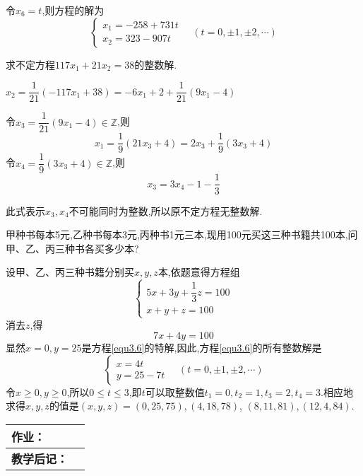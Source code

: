 令$x_{6}=t$,则方程的解为
\begin{equation*}
	\begin{cases}
		x_{1}=-258+731 t \\
		x_{2}=323-907 t
	\end{cases} \quad(t=0, \pm 1, \pm 2, \cdots)
\end{equation*}

\example 求不定方程$117 x_{1}+21 x_{2}=38$的整数解.

\solve $x_{2}=\dfrac{1}{21}\left(-117 x_{1}+38\right)=-6 x_{1}+2+\dfrac{1}{21}\left(9 x_{1}-4\right)$

令$x_{3}=\dfrac{1}{21}\left(9 x_{1}-4\right) \in \mathbb{Z}$,则
\begin{equation*}
	x_{1}=\frac{1}{9}\left(21 x_{3}+4\right)=2 x_{3}+\frac{1}{9}\left(3 x_{3}+4\right)
\end{equation*}
令$x_{4}=\dfrac{1}{9}\left(3 x_{3}+4\right) \in \mathbb{Z}$,则
\begin{equation*}
	x_{3}=3 x_{4}-1-\frac{1}{3}
\end{equation*}

此式表示$x_{3}, x_{4}$不可能同时为整数,所以原不定方程无整数解.

\example 甲种书每本5元,乙种书每本3元,丙种书1元三本,现用100元买这三种书籍共100本,问甲、乙、丙三种书各买多少本?

\solve 设甲、乙、丙三种书籍分别买$x, y, z$本,依题意得方程组
\begin{equation*}
	\begin{cases}
		5 x+3 y+\dfrac{1}{3} z=100 \\
		x+y+z=100
	\end{cases}
\end{equation*}
消去$z$,得
\begin{equation}\label{equ3.6}
	7 x+4 y=100
\end{equation}
显然$x=0, y=25$是方程\eqref{equ3.6}的特解,因此,方程\eqref{equ3.6}的所有整数解是
\begin{equation*}
	\begin{cases}
		x=4 t \\
		y=25-7 t
	\end{cases} \quad(t=0, \pm 1, \pm 2, \cdots)
\end{equation*}
令$x \geqslant 0, y \geqslant 0$,所以$0 \leqslant t \leqslant 3$,即$t$可以取整数值$t_{1}=0, t_{2}=1, t_{3}=2, t_{4}=3$.相应地求得$x, y, z$的值是$(x, y, z)=(0,25,75),(4,18,78)$, $(8,11,81),(12,4,84)$.

\begin{table}[htb]
	\centering  
	\begin{tabular}{p{22mm}|p{105.6mm}}
		\hline 
		\textbf{作业：}      &   \\ \hline
		\textbf{教学后记：}  & \vspace{4ex} \\ \hline
	\end{tabular}
\end{table}


